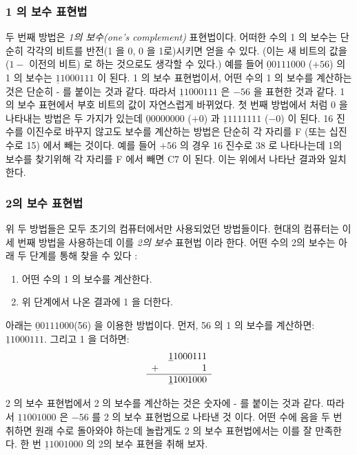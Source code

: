 \subsubsection{1 의 보수 표현법}

두 번째 방법은 \emph{1의 보수(one's complement)} 표현법이다. 어떠한 수의 1 의 보수는 단순히 각각의 비트를 반전(1 을 0, 0 을 1로)시키면 얻을 수 있다.
(이는 새 비트의 값을 ($1 -$ 이전의 비트) 로 하는 것으로도 생각할 수 있다.) 예를 들어 $\underline{0}0111000$ ($+56$) 의 1 의 보수는
$\underline{1}1000111$ 이 된다. 
1 의 보수 표현법이서, 어떤 수의 1 의 보수를 계산하는 것은 단순히 - 를 붙이는 것과 같다. 따라서 $\underline{1}1000111$ 은 $-56$ 을 표현한 것과 같다. 
1의 보수 표현에서 부호 비트의 값이 자연스럽게 바뀌었다. 첫 번째 방법에서 처럼 0 을 나타내는 방법은 두 가지가 있는데 $\underline{0}0000000$ ($+0$) 과 
$\underline{1}1111111$ ($-0$) 이 된다. 
16 진수를 이진수로 바꾸지 않고도 보수를 계산하는 방법은 단순히 각 자리를 F (또는 십진수로 15) 에서 빼는 것이다. 예를 들어 $+56$ 의 경우 16 진수로
38 로 나타나는데 1의 보수를 찾기위해 각 자리를 F 에서 빼면 C7 이 된다. 이는 위에서 나타난 결과와 일치한다. 

\subsubsection{2의 보수 표현법 
               }

위 두 방법들은 모두 초기의 컴퓨터에서만 사용되었던 방법들이다. 현대의 컴퓨터는 이 세 번째 방법을 사용하는데 이를 \emph{2의 보수} 표현법 이라 한다.
어떤 수의 2의 보수는 아래 두 단계를 통해 찾을 수 있다 :
\begin{enumerate}
\item 어떤 수의 1 의 보수를 계산한다. 
\item 위 단계에서 나온 결과에 1 을 더한다. 
\end{enumerate}
아래는 $\underline{0}0111000$(56) 을 이용한 방법이다. 먼저, 56 의 1 의 보수를 계산하면: $\underline{1}1000111$. 그리고 1 을 더하면:
\[
\begin{array}{rr}
 & \underline{1}1000111 \\
+&                    1 \\ \hline
 & \underline{1}1001000
\end{array}
\]

2 의 보수 표현법에서 2 의 보수를 계산하는 것은 숫자에 - 를 붙이는 것과 같다. 따라서 $\underline{1}1001000$ 은 $-56$ 를 2 의 보수 표현법으로 나타낸 것
이다. 어떤 수에 음을 두 번 취하면 원래 수로 돌아와야 하는데 놀랍게도 2 의 보수 표현법에서는 이를 잘 만족한다. 한 번 $\underline{1}1001000$
의 2의 보수 표현을 취해 보자. 


